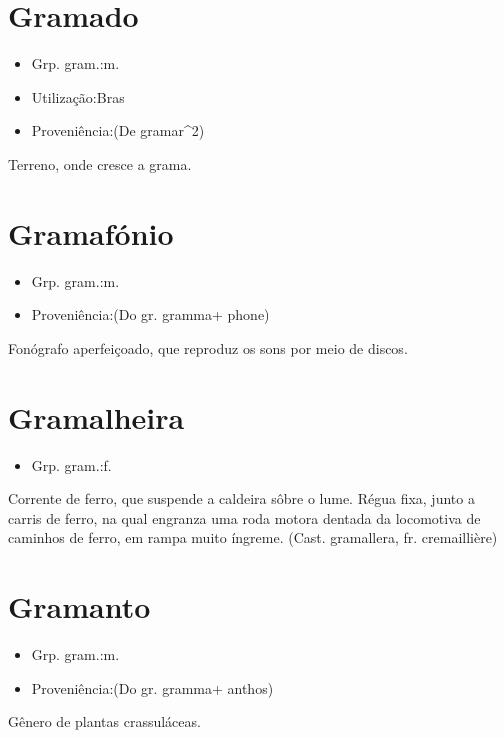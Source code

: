 \section{Gramado}
\begin{itemize}
\item {Grp. gram.:m.}
\end{itemize}
\begin{itemize}
\item {Utilização:Bras}
\end{itemize}
\begin{itemize}
\item {Proveniência:(De \textunderscore gramar\textunderscore ^2)}
\end{itemize}
Terreno, onde cresce a grama.
\section{Gramafónio}
\begin{itemize}
\item {Grp. gram.:m.}
\end{itemize}
\begin{itemize}
\item {Proveniência:(Do gr. \textunderscore gramma\textunderscore  + \textunderscore phone\textunderscore )}
\end{itemize}
Fonógrafo aperfeiçoado, que reproduz os sons por meio de discos.
\section{Gramalheira}
\begin{itemize}
\item {Grp. gram.:f.}
\end{itemize}
Corrente de ferro, que suspende a caldeira sôbre o lume.
Régua fixa, junto a carris de ferro, na qual engranza uma roda motora dentada da locomotiva de caminhos de ferro, em rampa muito íngreme.
(Cast. \textunderscore gramallera\textunderscore , fr. \textunderscore cremaillière\textunderscore )
\section{Gramanto}
\begin{itemize}
\item {Grp. gram.:m.}
\end{itemize}
\begin{itemize}
\item {Proveniência:(Do gr. \textunderscore gramma\textunderscore  + \textunderscore anthos\textunderscore )}
\end{itemize}
Gênero de plantas crassuláceas.
